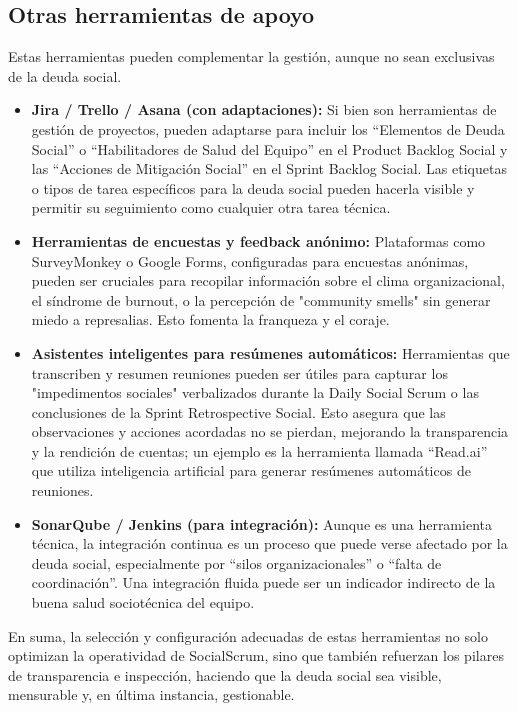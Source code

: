 \subsection{Otras herramientas de apoyo}
Estas herramientas pueden complementar la gestión, aunque no sean exclusivas de la deuda social.
\begin{itemize}
    \item \textbf{Jira / Trello / Asana (con adaptaciones):} Si bien son herramientas de gestión de proyectos, pueden adaptarse para incluir los ``Elementos de Deuda Social'' o ``Habilitadores de Salud del Equipo'' en el Product Backlog Social y las ``Acciones de Mitigación Social'' en el Sprint Backlog Social. Las etiquetas o tipos de tarea específicos para la deuda social pueden hacerla visible y permitir su seguimiento como cualquier otra tarea técnica.
    \item \textbf{Herramientas de encuestas y feedback anónimo:} Plataformas como SurveyMonkey o Google Forms, configuradas para encuestas anónimas, pueden ser cruciales para recopilar información sobre el clima organizacional, el síndrome de burnout, o la percepción de "community smells" sin generar miedo a represalias. Esto fomenta la franqueza y el coraje.
    \item \textbf{Asistentes inteligentes para resúmenes automáticos:} Herramientas que transcriben y resumen reuniones pueden ser útiles para capturar los "impedimentos sociales" verbalizados durante la Daily Social Scrum o las conclusiones de la Sprint Retrospective Social. Esto asegura que las observaciones y acciones acordadas no se pierdan, mejorando la transparencia y la rendición de cuentas; un ejemplo es la herramienta llamada ``Read.ai'' que utiliza inteligencia artificial para generar resúmenes automáticos de reuniones.
    \item \textbf{SonarQube / Jenkins (para integración):} Aunque es una herramienta técnica, la integración continua es un proceso que puede verse afectado por la deuda social, especialmente por ``silos organizacionales'' o ``falta de coordinación''. Una integración fluida puede ser un indicador indirecto de la buena salud sociotécnica del equipo.
\end{itemize}

En suma, la selección y configuración adecuadas de estas herramientas no solo optimizan la operatividad de SocialScrum, sino que también refuerzan los pilares de transparencia e inspección, haciendo que la deuda social sea visible, mensurable y, en última instancia, gestionable.

